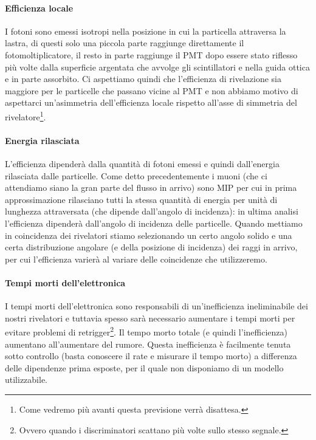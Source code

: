 \paragraph{Efficienza locale}
I fotoni sono emessi isotropi nella posizione in cui la particella attraversa la lastra,
di questi solo una piccola parte raggiunge direttamente il fotomoltiplicatore, il resto in parte raggiunge il PMT dopo essere stato riflesso più volte dalla superficie argentata che avvolge gli scintillatori e nella guida ottica e in parte assorbito. Ci aspettiamo quindi che l'efficienza di rivelazione sia maggiore per le particelle che passano vicine al PMT e non abbiamo motivo di aspettarci un'asimmetria dell'efficienza locale rispetto all'asse di simmetria del rivelatore\footnote{Come vedremo più avanti questa previsione verrà disattesa.}.

\paragraph{Energia rilasciata}
L'efficienza dipenderà dalla quantità di fotoni emessi e quindi dall'energia rilasciata dalle particelle. Come detto precedentemente i muoni (che ci attendiamo siano la gran parte del flusso in arrivo) sono MIP per cui in prima approssimazione rilasciano tutti la stessa quantità di energia per unità di lunghezza attraversata (che dipende dall'angolo di incidenza): in ultima analisi l'efficienza dipenderà dall'angolo di incidenza delle particelle.
Quando mettiamo in coincidenza dei rivelatori stiamo selezionando un certo angolo solido e una certa distribuzione angolare (e della posizione di incidenza) dei raggi in arrivo, per cui l'efficienza varierà al variare delle coincidenze che utilizzeremo.

\paragraph{Tempi morti dell'elettronica}
I tempi morti dell'elettronica sono responsabili di un'inefficienza ineliminabile dei nostri rivelatori e tuttavia spesso sarà necessario aumentare i tempi morti per evitare problemi di retrigger\footnote{Ovvero quando i discriminatori scattano più volte sullo stesso segnale.}. Il tempo morto totale (e quindi l'inefficienza) aumentano all'aumentare del rumore. Questa inefficienza è facilmente tenuta sotto controllo (basta conoscere il rate e misurare il tempo morto) a differenza delle dipendenze prima esposte, per il quale non disponiamo di un modello utilizzabile.

